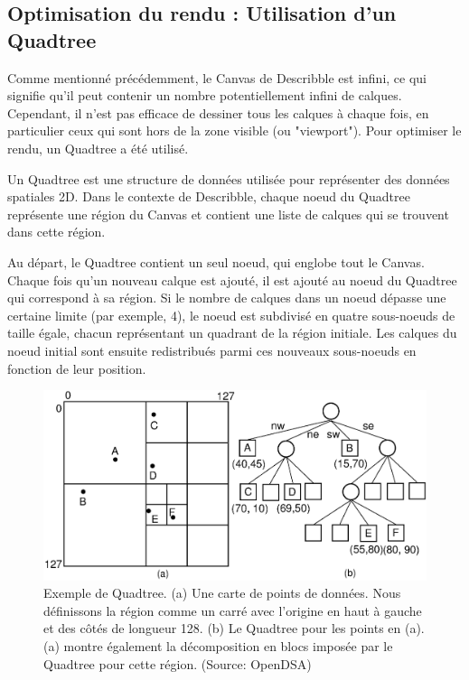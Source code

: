 \subsection{Optimisation du rendu : Utilisation d'un Quadtree}

Comme mentionné précédemment, le Canvas de \Gls{Describble} est infini, ce qui signifie qu'il peut contenir un nombre potentiellement infini de calques. Cependant, il n'est pas efficace de dessiner tous les calques à chaque fois, en particulier ceux qui sont hors de la zone visible (ou "viewport"). Pour optimiser le rendu, un Quadtree a été utilisé.

Un Quadtree est une structure de données utilisée pour représenter des données spatiales 2D. Dans le contexte de \Gls{Describble}, chaque noeud du Quadtree représente une région du Canvas et contient une liste de calques qui se trouvent dans cette région.

Au départ, le Quadtree contient un seul noeud, qui englobe tout le Canvas. Chaque fois qu'un nouveau calque est ajouté, il est ajouté au noeud du Quadtree qui correspond à sa région. Si le nombre de calques dans un noeud dépasse une certaine limite (par exemple, 4), le noeud est subdivisé en quatre sous-noeuds de taille égale, chacun représentant un quadrant de la région initiale. Les calques du noeud initial sont ensuite redistribués parmi ces nouveaux sous-noeuds en fonction de leur position.

\begin{figure}[H]
    \centering
    \includegraphics[width=\textwidth]{assets/figures/quadtree.png}
    \caption{Exemple de Quadtree. (a) Une carte de points de données. Nous définissons la région comme un carré avec l'origine en haut à gauche et des côtés de longueur 128. (b) Le Quadtree pour les points en (a). (a) montre également la décomposition en blocs imposée par le Quadtree pour cette région. (Source: OpenDSA\cite{opendsaprojectPRQuadtreeData})}
    \label{fig:quadtree}
\end{figure}

